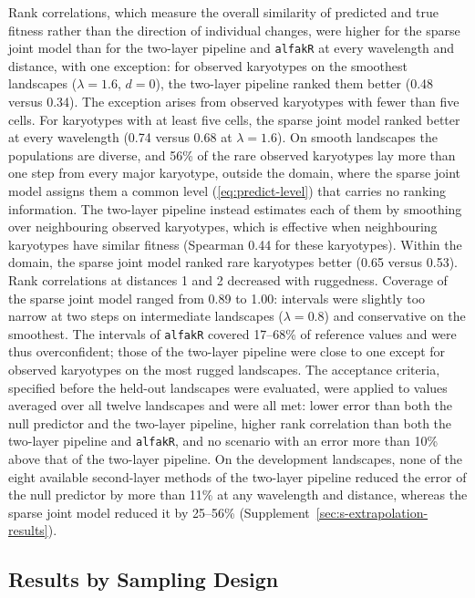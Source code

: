 \documentclass[11pt]{article}
\begin{document}
Rank correlations, which measure the overall similarity of predicted and true
fitness rather than the direction of individual changes, were higher for the
sparse joint model than for the two-layer pipeline and
\texttt{alfakR} at every wavelength and distance, with one exception: for
observed karyotypes on the smoothest landscapes ($\lambda=1.6$, $d=0$), the
two-layer pipeline ranked them better (0.48 versus 0.34). The exception
arises from observed karyotypes with fewer than five cells. For karyotypes
with at least five cells, the sparse joint model ranked better at every
wavelength (0.74 versus 0.68 at $\lambda=1.6$). On smooth landscapes the
populations are diverse, and 56\% of the rare observed karyotypes lay more
than one step from every major karyotype, outside the domain, where the
sparse joint model assigns them a common level (\ref{eq:predict-level}) that
carries no ranking information. The two-layer pipeline instead estimates each
of them by smoothing over neighbouring observed karyotypes, which is effective
when neighbouring karyotypes have similar fitness (Spearman 0.44 for these
karyotypes). Within the domain, the sparse joint model ranked rare karyotypes
better (0.65 versus 0.53). Rank correlations at distances 1 and 2 decreased
with ruggedness. Coverage of the sparse joint model
ranged from 0.89 to 1.00: intervals were slightly too narrow at two steps on
intermediate landscapes ($\lambda=0.8$) and conservative on the smoothest.
The intervals of \texttt{alfakR} covered 17--68\% of reference values and
were thus overconfident; those of the two-layer pipeline were close to one
except for observed karyotypes on the most rugged landscapes. The acceptance
criteria, specified before the held-out landscapes were evaluated, were
applied to values averaged over all twelve landscapes and were all met: lower
error than both the null predictor and the two-layer pipeline, higher rank
correlation than both the two-layer pipeline and \texttt{alfakR}, and no
scenario with an error more than 10\% above that of the two-layer pipeline.
On the development landscapes, none of the eight
available second-layer methods of the two-layer pipeline reduced the error
of the null predictor by more than 11\% at any wavelength and distance,
whereas the sparse joint model reduced it by 25--56\%
(Supplement~\ref{sec:s-extrapolation-results}).

\subsection{Results by Sampling Design}
\label{sec:val-sampling}
\end{document}

